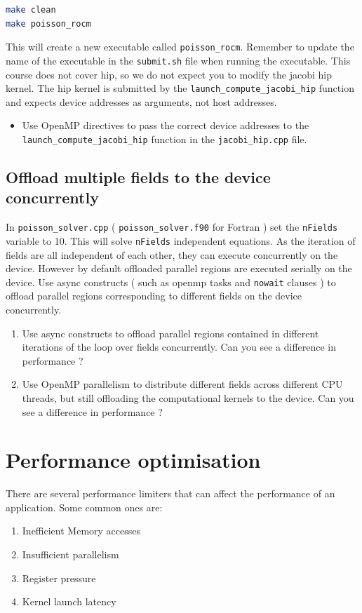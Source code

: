 \documentclass{article}
\begin{document}
\begin{lstlisting}[language=Bash]
make clean
make poisson_rocm
\end{lstlisting}

This will create a new executable called \texttt{poisson\_rocm}. Remember to update the name of the executable in the \texttt{submit.sh} file when running the executable.
This course does not cover hip, so we do not expect you to modify the jacobi hip kernel. The hip kernel is submitted by the \texttt{launch\_compute\_jacobi\_hip} function and expects device addresses as arguments, not host addresses. 

\begin{itemize}
    \item Use OpenMP directives to pass the correct device addresses to the \texttt{launch\_compute\_jacobi\_hip} function in the \texttt{jacobi\_hip.cpp} file.
\end{itemize}

\subsection{Offload multiple fields to the device concurrently}
In \texttt{poisson\_solver.cpp} ( \texttt{poisson\_solver.f90} for Fortran ) set the \texttt{nFields} variable to 10. This will solve \texttt{nFields} independent equations. As the iteration of fields are all independent of each other, they can execute concurrently on the device. However by default offloaded parallel regions are executed serially on the device. Use async constructs ( such as openmp tasks and \texttt{nowait} clauses ) to offload parallel regions corresponding to different fields on the device concurrently.
\begin{enumerate}
    \item Use async constructs to offload parallel regions contained in different iterations of the loop over fields concurrently. Can you see a difference in performance ?
    \item Use OpenMP parallelism to distribute different fields across different CPU threads, but still offloading the computational kernels to the device.  Can you see a difference in performance ?
\end{enumerate}

\section{Performance optimisation}

There are several performance limiters that can affect the performance of an application. Some common ones are:
\begin{enumerate}
    \item Inefficient Memory accesses
    \item Insufficient parallelism
    \item Register pressure
    \item Kernel launch latency
\end{enumerate}
\end{document}
